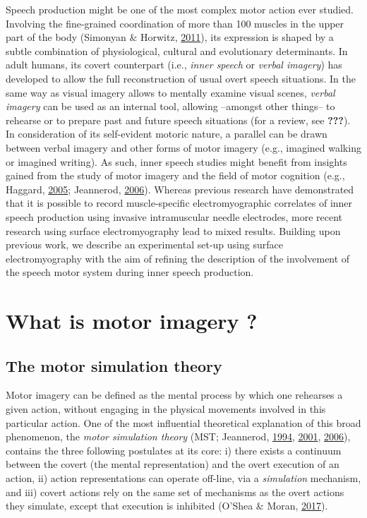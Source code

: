 \documentclass[a4paper,12pt,twoside,openright,oldfontcommands]{memoir}
\begin{document}
Speech production might be one of the most complex motor action ever
studied. Involving the fine-grained coordination of more than 100
muscles in the upper part of the body (Simonyan \& Horwitz,
\protect\hyperlink{ref-simonyan_laryngeal_2011}{2011}), its expression
is shaped by a subtle combination of physiological, cultural and
evolutionary determinants. In adult humans, its covert counterpart
(i.e., \emph{inner speech} or \emph{verbal imagery}) has developed to
allow the full reconstruction of usual overt speech situations. In the
same way as visual imagery allows to mentally examine visual scenes,
\emph{verbal imagery} can be used as an internal tool, allowing
--amongst other things-- to rehearse or to prepare past and future
speech situations (for a review, see {\textbf{???}}). In consideration
of its self-evident motoric nature, a parallel can be drawn between
verbal imagery and other forms of motor imagery (e.g., imagined walking
or imagined writing). As such, inner speech studies might benefit from
insights gained from the study of motor imagery and the field of motor
cognition (e.g., Haggard,
\protect\hyperlink{ref-haggard_conscious_2005}{2005}; Jeannerod,
\protect\hyperlink{ref-jeannerod_motor_2006}{2006}). Whereas previous
research have demonstrated that it is possible to record muscle-specific
electromyographic correlates of inner speech production using invasive
intramuscular needle electrodes, more recent research using surface
electromyography lead to mixed results. Building upon previous work, we
describe an experimental set-up using surface electromyography with the
aim of refining the description of the involvement of the speech motor
system during inner speech production.

\section{What is motor imagery ?}\label{what-is-motor-imagery}

\subsection{The motor simulation
theory}\label{the-motor-simulation-theory}

Motor imagery can be defined as the mental process by which one
rehearses a given action, without engaging in the physical movements
involved in this particular action. One of the most influential
theoretical explanation of this broad phenomenon, the \emph{motor
simulation theory} (MST; Jeannerod,
\protect\hyperlink{ref-jeannerod_representing_1994}{1994},
\protect\hyperlink{ref-jeannerod_neural_2001}{2001},
\protect\hyperlink{ref-jeannerod_motor_2006}{2006}), contains the three
following postulates at its core: i) there exists a continuum between
the covert (the mental representation) and the overt execution of an
action, ii) action representations can operate off-line, via a
\emph{simulation} mechanism, and iii) covert actions rely on the same
set of mechanisms as the overt actions they simulate, except that
execution is inhibited (O'Shea \& Moran,
\protect\hyperlink{ref-oshea_does_2017}{2017}).
\end{document}
